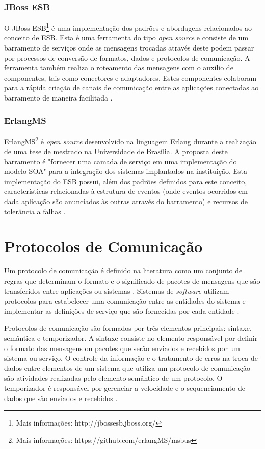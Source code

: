 \subsubsection{JBoss ESB}
O JBoss ESB\footnote{Mais informações: http://jbossesb.jboss.org/} é uma implementação dos padrões e abordagens relacionados ao conceito de ESB. Esta é uma ferramenta do tipo \textit{open source} e consiste de um barramento de serviços onde as mensagens trocadas através deste podem passar por processos de conversão de formatos, dados e protocolos de comunicação. A ferramenta também realiza o roteamento das mensagens com o auxílio de componentes, tais como conectores e adaptadores. Estes componentes colaboram para a rápida criação de canais de comunicação entre as aplicações conectadas ao barramento de maneira facilitada \cite{silva_jbossesb_2008}.

\subsubsection{ErlangMS}
ErlangMS\footnote{Mais informações: https://github.com/erlangMS/msbus} é \textit{open source} desenvolvido na linguagem Erlang durante a realização de uma tese de mestrado na Universidade de Brasília. A proposta deste barramento é "fornecer uma camada de serviço em uma implementação do modelo SOA" para a integração dos sistemas implantados na instituição. Esta implementação do ESB possui, além dos padrões definidos para este conceito, características relacionadas à estrutura de eventos (onde eventos ocorridos em dada aplicação são anunciados às outras através do barramento) e recursos de tolerância a falhas \cite{agilar_uma_2015}.

\section{Protocolos de Comunicação}
Um protocolo de comunicação é definido na literatura como um conjunto de regras que determinam o formato e o significado de pacotes de mensagens que são transferidos entre aplicações ou sistemas \cite{Stallings_2006}. Sistemas de \textit{software} utilizam protocolos para estabelecer uma comunicação entre as entidades do sistema e implementar as definições de serviço que são fornecidas por cada entidade \cite{Stallings_2006}.

Protocolos de comunicação são formados por três elementos principais: sintaxe, semântica e temporizador. A sintaxe consiste no elemento responsável por definir o formato das mensagens ou pacotes que serão enviados e recebidos por um sistema ou serviço. O controle da informação e o tratamento de erros na troca de dados entre elementos de um sistema que utiliza um protocolo de comunicação são atividades realizadas pelo elemento semântico de um protocolo. O temporizador é responsável por gerenciar a velocidade e o sequenciamento de dados que são enviados e recebidos \cite{Stallings_2006}.

